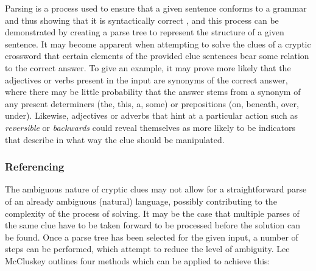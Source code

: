 Parsing is a process used to ensure that a given sentence conforms to a grammar and thus showing that it is syntactically correct \citep{mccluskey99}, and this process can be demonstrated by creating a parse tree to represent the structure of a given sentence. It may become apparent when attempting to solve the clues of a cryptic crossword that certain elements of the provided clue sentences bear some relation to the correct answer. To give an example, it may prove more likely that the adjectives or verbs present in the input are synonyms of the correct answer, where there may be little probability that the answer stems from a synonym of any present determiners (the, this, a, some) or prepositions (on, beneath, over, under). Likewise, adjectives or adverbs that hint at a particular action such as \emph{reversible} or \emph{backwards} could reveal themselves as more likely to be indicators that describe in what way the clue should be manipulated.

\subsubsection{Referencing}

The ambiguous nature of cryptic clues may not allow for a straightforward parse of an already ambiguous (natural) language, possibly contributing to the complexity of the process of solving. It may be the case that multiple parses of the same clue have to be taken forward to be processed before the solution can be found. Once a parse tree has been selected for the given input, a number of steps can be performed, which attempt to reduce the level of ambiguity. Lee McCluskey outlines four methods which can be applied to achieve this:

